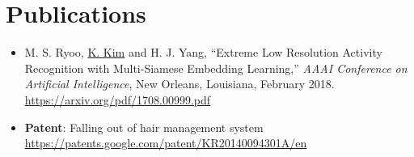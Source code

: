 \documentclass[letterpaper,11pt]{article}
\newcommand{\resumeItem}[2]{
  \item\small{
    \textbf{#1}{: #2 \vspace{-2pt}}
  }
}
\newcommand{\resumeSimpleItem}[1]{
  \item\small{
    {#1 \vspace{-2pt}}
  }
}
\newcommand{\resumeHeadItemListStart}{\begin{itemize}[leftmargin=*]}
\newcommand{\resumeHeadItemListEnd}{\end{itemize}\vspace{-5pt}}
\begin{document}
\section{Publications}
  \resumeHeadItemListStart
    \resumeSimpleItem
          {M. S. Ryoo, \underline{K. Kim} and H. J. Yang, ``Extreme Low Resolution Activity Recognition with Multi-Siamese Embedding Learning,'' \textit{AAAI Conference on Artificial Intelligence}, New Orleans, Louisiana, February 2018. \textit{{\color{acceptance}{[acceptance rate: 24.6\%]}}}\\
          \href{https://arxiv.org/pdf/1708.00999.pdf}{\underline{https://arxiv.org/pdf/1708.00999.pdf}}}
    \resumeItem{Patent}{Falling out of hair management system\\
                      \href{https://patents.google.com/patent/KR20140094301A/en}{\underline{https://patents.google.com/patent/KR20140094301A/en}}}
  \resumeHeadItemListEnd

\end{document}
